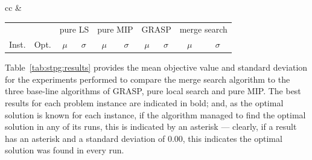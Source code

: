 \documentclass[journal]{IEEEtran}
\begin{document}
\begin{table}[h]
\begin{tabular}{cc}
&
\centering
\begin{adjustbox}{width=0.48\textwidth}
\begin{tabular}{lrrrrrrrrr} \toprule
 &  & \multicolumn{2}{c}{pure LS} & \multicolumn{2}{c}{pure MIP} & \multicolumn{2}{c}{GRASP} & \multicolumn{2}{c}{merge search}\\
\cmidrule(lr){3-4} \cmidrule(lr){5-6} \cmidrule(lr){7-8} \cmidrule(lr){9-10} 
Inst. & Opt. & \multicolumn{1}{c}{\(\mu\)}&\multicolumn{1}{c}{\(\sigma\)} & \multicolumn{1}{c}{\(\mu\)}&\multicolumn{1}{c}{\(\sigma\)}& \multicolumn{1}{c}{\(\mu\)}&\multicolumn{1}{c}{\(\sigma\)} & \multicolumn{1}{c}{\(\mu\)}&\multicolumn{1}{c}{\(\sigma\)}\\ \midrule
%

%
\bottomrule
\end{tabular}
\end{adjustbox}

\end{tabular}
\end{table}

Table~\ref{tab:stpg:results} provides the mean objective value and standard deviation for the experiments performed to compare the merge search algorithm to the three base-line algorithms of GRASP, pure local search and pure MIP. The best results for each problem instance are indicated in bold; and, as the optimal solution is known for each instance, if the algorithm managed to find the optimal solution in any of its runs, this is indicated by an asterisk --- clearly, if a result has an asterisk and a standard deviation of 0.00, this indicates the optimal solution was found in every run.
\end{document}
